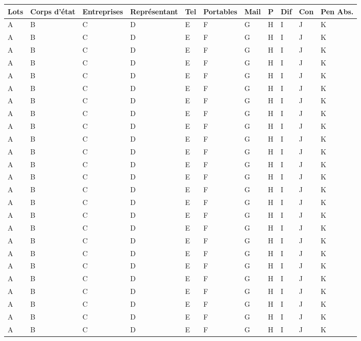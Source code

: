 \begin{center}
\begin{tabular}{|p{.5cm}|p{2cm}|p{2cm}|p{1.5cm}|p{1.5cm}|p{1.5cm}|p{2cm}|p{.3cm}|p{.3cm}|p{.3cm}|p{.3cm}|}
\hline
   Lots & Corps d'état & Entreprises & Représentant & Tel & Portables & Mail & P & Dif & Con & Pen Abs. \\
\hline
\hline
   A & B & C & D & E & F & G & H & I & J & K \\
\hline
   A & B & C & D & E & F & G & H & I & J & K \\
\hline
   A & B & C & D & E & F & G & H & I & J & K \\
\hline
   A & B & C & D & E & F & G & H & I & J & K \\
\hline
   A & B & C & D & E & F & G & H & I & J & K \\
\hline
   A & B & C & D & E & F & G & H & I & J & K \\
\hline
   A & B & C & D & E & F & G & H & I & J & K \\
\hline
   A & B & C & D & E & F & G & H & I & J & K \\
\hline
   A & B & C & D & E & F & G & H & I & J & K \\
\hline
   A & B & C & D & E & F & G & H & I & J & K \\
\hline
   A & B & C & D & E & F & G & H & I & J & K \\
\hline
   A & B & C & D & E & F & G & H & I & J & K \\
\hline
   A & B & C & D & E & F & G & H & I & J & K \\
\hline
   A & B & C & D & E & F & G & H & I & J & K \\
\hline
   A & B & C & D & E & F & G & H & I & J & K \\
\hline
   A & B & C & D & E & F & G & H & I & J & K \\
\hline
   A & B & C & D & E & F & G & H & I & J & K \\
\hline
   A & B & C & D & E & F & G & H & I & J & K \\
\hline
   A & B & C & D & E & F & G & H & I & J & K \\
\hline
   A & B & C & D & E & F & G & H & I & J & K \\
\hline
   A & B & C & D & E & F & G & H & I & J & K \\
\hline
   A & B & C & D & E & F & G & H & I & J & K \\
\hline
   A & B & C & D & E & F & G & H & I & J & K \\
\hline
   A & B & C & D & E & F & G & H & I & J & K \\
\hline
   A & B & C & D & E & F & G & H & I & J & K \\
\hline
\end{tabular}

\end{center}

\newpage

